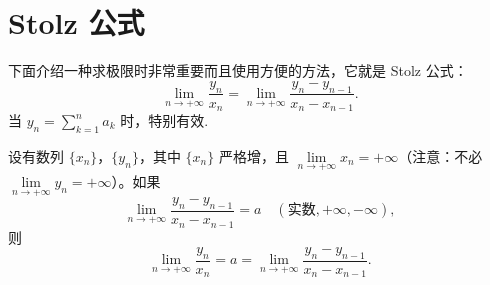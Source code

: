 \section{Stolz 公式}
\label{sec:1.6}

下面介绍一种求极限时非常重要而且使用方便的方法，它就是 Stolz 公式：
\[
\lim_{n\to+\infty} \frac{y_n}{x_n} = \lim_{n\to+\infty} \frac{y_n - y_{n-1}}{x_n - x_{n-1}}.
\]
当 $y_n = \sum\limits_{k=1}^n a_k$ 时，特别有效.

\begin{theorem}\label{thm:1.6.1}
设有数列 $\{x_n\}$，$\{y_n\}$，其中 $\{x_n\}$ 严格增，且 $\lim\limits_{n\to+\infty} x_n = +\infty$（注意：不必 $\lim\limits_{n\to+\infty} y_n = +\infty$）。如果
\[
\lim_{n\to+\infty} \frac{y_n - y_{n-1}}{x_n - x_{n-1}} = a\quad (\text{实数}, +\infty, -\infty),
\]
则
\[
\lim_{n\to+\infty} \frac{y_n}{x_n} = a = \lim_{n\to+\infty} \frac{y_n - y_{n-1}}{x_n - x_{n-1}}.
\]
\end{theorem}

